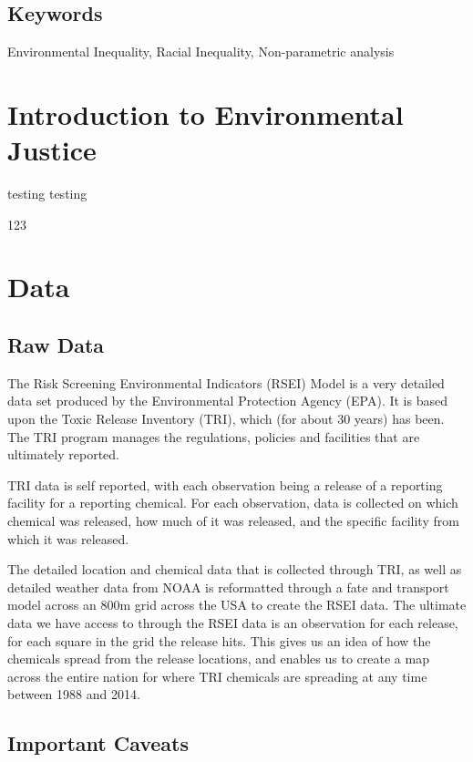 \documentclass[12pt,twoside]{dukestatscithesis}
\theoremstyle{definition}
\theoremstyle{definition}
\theoremstyle{definition}
\theoremstyle{remark}
\begin{document}
\section{Keywords}\label{keywords}

Environmental Inequality, Racial Inequality, Non-parametric analysis

\chapter{Introduction to Environmental Justice}\label{rmd-basics}

testing testing

123

\chapter{Data}\label{math}

\section{Raw Data}\label{raw-data}

The Risk Screening Environmental Indicators (RSEI) Model is a very
detailed data set produced by the Environmental Protection Agency (EPA).
It is based upon the Toxic Release Inventory (TRI), which (for about 30
years) has been. The TRI program manages the regulations, policies and
facilities that are ultimately reported.

TRI data is self reported, with each observation being a release of a
reporting facility for a reporting chemical. For each observation, data
is collected on which chemical was released, how much of it was
released, and the specific facility from which it was released.

The detailed location and chemical data that is collected through TRI,
as well as detailed weather data from NOAA is reformatted through a fate
and transport model across an 800m grid across the USA to create the
RSEI data. The ultimate data we have access to through the RSEI data is
an observation for each release, for each square in the grid the release
hits. This gives us an idea of how the chemicals spread from the release
locations, and enables us to create a map across the entire nation for
where TRI chemicals are spreading at any time between 1988 and 2014.

\section{Important Caveats}\label{important-caveats}
\end{document}
